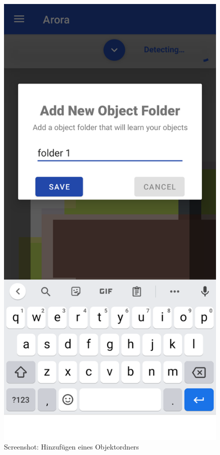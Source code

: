 \documentclass[oneside]{ausarbeitung}
\begin{document}
\begin{figure}[hptb]
	\centering
	\includegraphics[height=0.6\textheight]{images/screenshots/add-folder.png}
	\caption{Screenshot: Hinzufügen eines Objektordners}
	\label{fig:screenshot:add-model}
\end{figure}
\end{document}

